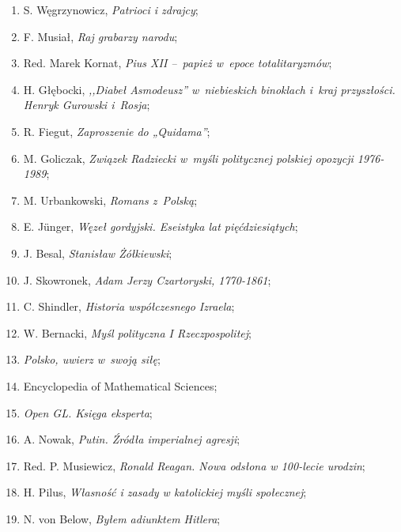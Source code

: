 \documentclass[a4paper,11pt]{article}
\begin{document}
\begin{enumerate}
\item S. Węgrzynowicz, \emph{Patrioci i zdrajcy};

\item F. Musiał, \emph{Raj grabarzy narodu};

\item Red. Marek Kornat, \emph{Pius XII --~papież w~epoce
    totalitaryzmów};

\item H. Głębocki, \emph{,,Diabeł Asmodeusz'' w~niebieskich binoklach
    i~kraj przyszłości. Henryk Gurowski i~Rosja};

\item R. Fiegut, \emph{Zaproszenie do „Quidama”};

\item M. Goliczak, \emph{Związek Radziecki w~myśli politycznej
    polskiej opozycji 1976-1989};

\item M. Urbankowski, \emph{Romans z~Polską};

\item E. J\"{u}nger, \emph{Węzeł gordyjski. Eseistyka lat
    pięćdziesiątych};

\item J. Besal, \emph{Stanisław Żółkiewski};

\item J. Skowronek, \emph{Adam Jerzy Czartoryski, 1770-1861};

\item C. Shindler, \emph{Historia współczesnego Izraela};

\item W. Bernacki, \emph{Myśl polityczna I Rzeczpospolitej};

\item \emph{Polsko, uwierz w~swoją siłę};

\item Encyclopedia of Mathematical Sciences;

\item \emph{Open GL. Księga eksperta};

\item A. Nowak, \emph{Putin. Źródła imperialnej agresji};

\item Red. P. Musiewicz, \emph{Ronald Reagan. Nowa odsłona w 100-lecie
    urodzin};

\item H. Pilus, \emph{Własność i zasady w katolickiej myśli
    społecznej};

\item N. von Below, \emph{Byłem adiunktem Hitlera};


\end{enumerate}
\end{document}
